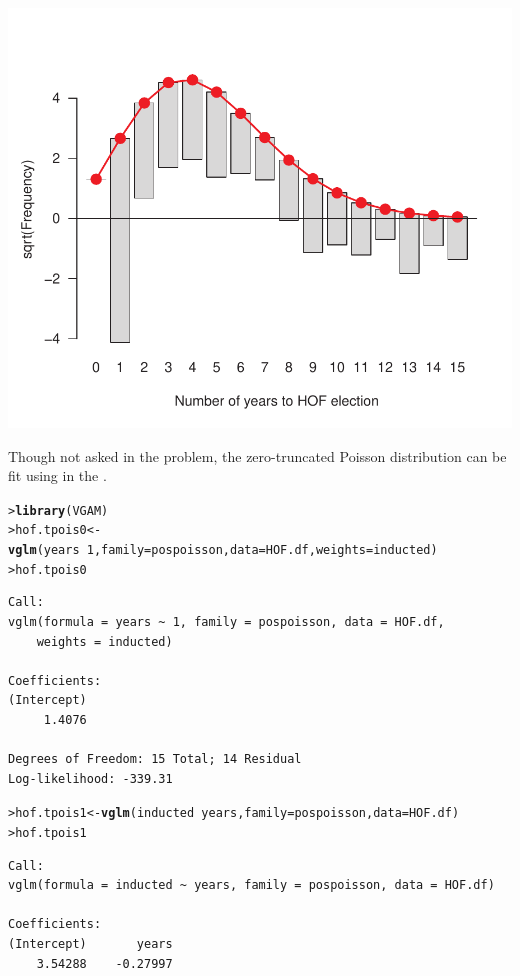 \documentclass[10pt]{report}\usepackage[]{graphicx}\usepackage[]{color}
\makeatletter
\newcommand{\hlnum}[1]{\textcolor[rgb]{0.686,0.059,0.569}{#1}}%
\newcommand{\hlopt}[1]{\textcolor[rgb]{0,0,0}{#1}}%
\newcommand{\hlstd}[1]{\textcolor[rgb]{0.345,0.345,0.345}{#1}}%
\newcommand{\hlkwb}[1]{\textcolor[rgb]{0.69,0.353,0.396}{#1}}%
\newcommand{\hlkwc}[1]{\textcolor[rgb]{0.333,0.667,0.333}{#1}}%
\newcommand{\hlkwd}[1]{\textcolor[rgb]{0.737,0.353,0.396}{\textbf{#1}}}%
\newenvironment{kframe}{%
 \def\at@end@of@kframe{}%
 \ifinner\ifhmode%
  \def\at@end@of@kframe{\end{minipage}}%
  \begin{minipage}{\columnwidth}%
 \fi\fi%
 \def\FrameCommand##1{\hskip\@totalleftmargin \hskip-\fboxsep
 \colorbox{shadecolor}{##1}\hskip-\fboxsep
     \hskip-\linewidth \hskip-\@totalleftmargin \hskip\columnwidth}%
 \MakeFramed {\advance\hsize-\width
   \@totalleftmargin\z@ \linewidth\hsize
   \@setminipage}}%
 {\par\unskip\endMakeFramed%
 \at@end@of@kframe}
\newenvironment{knitrout}{}{} %
\renewenvironment{knitrout}{\small\renewcommand{\baselinestretch}{.85}}{} %
\makeatother
\begin{document}
\begin{Exercises}
\begin{enumerate*}
\begin{ans}
\begin{knitrout}
\centerline{\includegraphics[width=.5\textwidth]{soln/fig/ex3_12c-1} }



\end{knitrout}
      Though not asked in the problem, the zero-truncated Poisson distribution can be fit using 
      in the . 
\begin{knitrout}\footnotesize
{}\color{fgcolor}\begin{kframe}
\begin{alltt}
\hlstd{> }\hlkwd{library}\hlstd{(VGAM)}
\hlstd{> }\hlstd{hof.tpois0} \hlkwb{<-} \hlkwd{vglm}\hlstd{(years} \hlopt{~} \hlnum{1}\hlstd{,} \hlkwc{family}\hlstd{=pospoisson,} \hlkwc{data}\hlstd{=HOF.df,} \hlkwc{weights}\hlstd{=inducted)}
\hlstd{> }\hlstd{hof.tpois0}
\end{alltt}
\begin{verbatim}
Call:
vglm(formula = years ~ 1, family = pospoisson, data = HOF.df, 
    weights = inducted)

Coefficients:
(Intercept) 
     1.4076 

Degrees of Freedom: 15 Total; 14 Residual
Log-likelihood: -339.31 
\end{verbatim}
\begin{alltt}
\hlstd{> }\hlstd{hof.tpois1} \hlkwb{<-} \hlkwd{vglm}\hlstd{(inducted} \hlopt{~} \hlstd{years,} \hlkwc{family}\hlstd{=pospoisson,} \hlkwc{data}\hlstd{=HOF.df)}
\hlstd{> }\hlstd{hof.tpois1}
\end{alltt}
\begin{verbatim}
Call:
vglm(formula = inducted ~ years, family = pospoisson, data = HOF.df)

Coefficients:
(Intercept)       years 
    3.54288    -0.27997 


\end{verbatim}
\end{kframe}
\end{knitrout}
\end{ans}
\end{enumerate*}
\end{Exercises}
\end{document}
